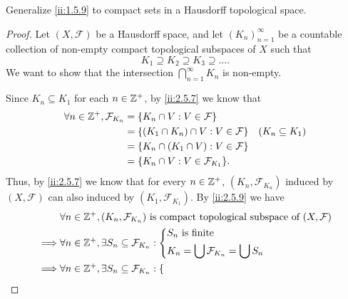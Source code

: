 \begin{ex}\label{ii:ex:2.5.13}
  Generalize \cref{ii:1.5.9} to compact sets in a Hausdorff topological space.
\end{ex}

\begin{proof}
  Let \((X, \mathcal{F})\) be a Hausdorff space, and let \((K_n)_{n = 1}^\infty\) be a countable collection of non-empty compact topological subspaces of \(X\) such that
  \[
    K_1 \supseteq K_2 \supseteq K_3 \supseteq \dots.
  \]
  We want to show that the intersection \(\bigcap_{n = 1}^\infty K_n\) is non-empty.

  Since \(K_n \subseteq K_1\) for each \(n \in \mathbb{Z}^+\), by \cref{ii:2.5.7} we know that
  \begin{align*}
    \forall n \in \Z^+, \mathcal{F}_{K_n} & = \set{K_n \cap V : V \in \mathcal{F}}                                  \\
                                          & = \set{(K_1 \cap K_n) \cap V : V \in \mathcal{F}} & (K_n \subseteq K_1) \\
                                          & = \set{K_n \cap (K_1 \cap V) : V \in \mathcal{F}}                       \\
                                          & = \set{K_n \cap V : V \in \mathcal{F}_{K_1}}.
  \end{align*}
  Thus, by \cref{ii:2.5.7} we know that for every \(n \in \mathbb{Z}^+\), \((K_n, \mathcal{F}_{K_n})\) induced by \((X, \mathcal{F})\) can also induced by \((K_1, \mathcal{F}_{K_1})\).
  By \cref{ii:2.5.9} we have
  \begin{align*}
             & \forall n \in \Z^+, (K_n, \mathcal{F}_{K_n}) \text{ is compact topological subspace of } (X, \mathcal{F})                                                               \\
    \implies & \forall n \in \Z^+, \exists S_n \subseteq \mathcal{F}_{K_n} : \begin{dcases}
                                                                               S_n \text{ is finite} \\
                                                                               K_n = \bigcup \mathcal{F}_{K_n} = \bigcup S_n
                                                                             \end{dcases}                                                              \\
    \implies & \forall n \in \Z^+, \exists S_n \subseteq \mathcal{F}_{K_n} : \begin{dcases}

\end{dcases}
\end{align*}
\end{proof}
